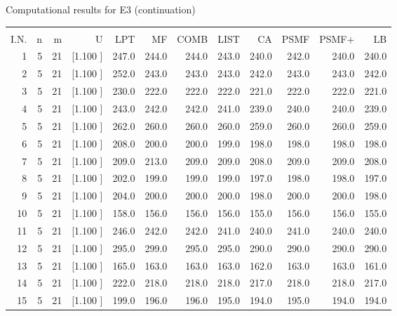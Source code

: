 \documentclass[12pt,a4paper]{article}
\begin{document}
\newpage
\begin{center}
 Computational results for E3 (continuation) {\tiny
\begin{tabular}{r r r r r r r r r r r r}\hline
    &   &   &          &        &        &        &        &        &        &        &       \\[-0.1in]
  I.N.  &  n  &  m  &  U  &  LPT  &  MF  &  COMB  &  LIST  &  CA  & PSMF &PSMF+ & LB \\[0.03in]
\hline
   1&  5& 21&[1.100     ]&   247.0&   244.0&   244.0&   243.0&   240.0&   242.0&   240.0&   240.0\\[-0.02in]
   2&  5& 21&[1.100     ]&   252.0&   243.0&   243.0&   243.0&   242.0&   243.0&   243.0&   242.0\\[-0.02in]
   3&  5& 21&[1.100     ]&   230.0&   222.0&   222.0&   222.0&   221.0&   222.0&   222.0&   221.0\\[-0.02in]
   4&  5& 21&[1.100     ]&   243.0&   242.0&   242.0&   241.0&   239.0&   240.0&   240.0&   239.0\\[-0.02in]
   5&  5& 21&[1.100     ]&   262.0&   260.0&   260.0&   260.0&   259.0&   260.0&   260.0&   259.0\\[-0.02in]
   6&  5& 21&[1.100     ]&   208.0&   200.0&   200.0&   199.0&   198.0&   198.0&   198.0&   198.0\\[-0.02in]
   7&  5& 21&[1.100     ]&   209.0&   213.0&   209.0&   209.0&   208.0&   209.0&   209.0&   208.0\\[-0.02in]
   8&  5& 21&[1.100     ]&   202.0&   199.0&   199.0&   199.0&   197.0&   198.0&   198.0&   197.0\\[-0.02in]
   9&  5& 21&[1.100     ]&   204.0&   200.0&   200.0&   200.0&   198.0&   200.0&   200.0&   198.0\\[-0.02in]
  10&  5& 21&[1.100     ]&   158.0&   156.0&   156.0&   156.0&   155.0&   156.0&   156.0&   155.0\\[-0.02in]
  11&  5& 21&[1.100     ]&   246.0&   242.0&   242.0&   241.0&   240.0&   241.0&   240.0&   240.0\\[-0.02in]
  12&  5& 21&[1.100     ]&   295.0&   299.0&   295.0&   295.0&   290.0&   290.0&   290.0&   290.0\\[-0.02in]
  13&  5& 21&[1.100     ]&   165.0&   163.0&   163.0&   163.0&   162.0&   163.0&   163.0&   161.0\\[-0.02in]
  14&  5& 21&[1.100     ]&   222.0&   218.0&   218.0&   218.0&   217.0&   218.0&   218.0&   217.0\\[-0.02in]
  15&  5& 21&[1.100     ]&   199.0&   196.0&   196.0&   195.0&   194.0&   195.0&   194.0&   194.0\\[-0.02in]

\end{tabular}}
\end{center}
\end{document}
